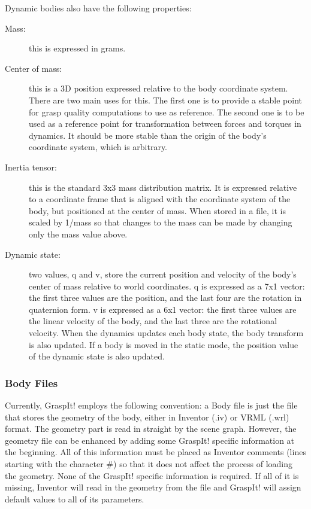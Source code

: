 Dynamic bodies also have the following properties:

\begin{description}
\item[Mass:] this is expressed in grams.
\item[Center of mass:] this is a 3D position expressed relative to the
  body coordinate system. There are two main uses for this. The first
  one is to provide a stable point for grasp quality computations to
  use as reference. The second one is to be used as a reference point
  for transformation between forces and torques in dynamics. It should
  be more stable than the origin of the body's coordinate system,
  which is arbitrary.
\item[Inertia tensor:] this is the standard 3x3 mass distribution
  matrix. It is expressed relative to a coordinate frame that is
  aligned with the coordinate system of the body, but positioned at
  the center of mass. When stored in a file, it is scaled by 1/mass so
  that changes to the mass can be made by changing only the mass value
  above.
\item[Dynamic state:] two values, q and v, store the current position
  and velocity of the body's center of mass relative to world
  coordinates. q is expressed as a 7x1 vector: the first three values
  are the position, and the last four are the rotation in quaternion
  form. v is expressed as a 6x1 vector: the first three values are the
  linear velocity of the body, and the last three are the rotational
  velocity. When the dynamics updates each body state, the body
  transform is also updated. If a body is moved in the static mode,
  the position value of the dynamic state is also updated.
\end{description}

\subsubsection{Body Files}

Currently, GraspIt! employs the following convention: a Body file is
just the file that stores the geometry of the body, either in Inventor
(.iv) or VRML (.wrl) format. The geometry part is read in straight by
the scene graph. However, the geometry file can be enhanced by adding
some GraspIt! specific information at the beginning. All of this
information must be placed as Inventor comments (lines starting with
the character \#) so that it does not affect the process of loading the
geometry. None of the GraspIt! specific information is required. If
all of it is missing, Inventor will read in the geometry from the file
and GraspIt! will assign default values to all of its parameters.

